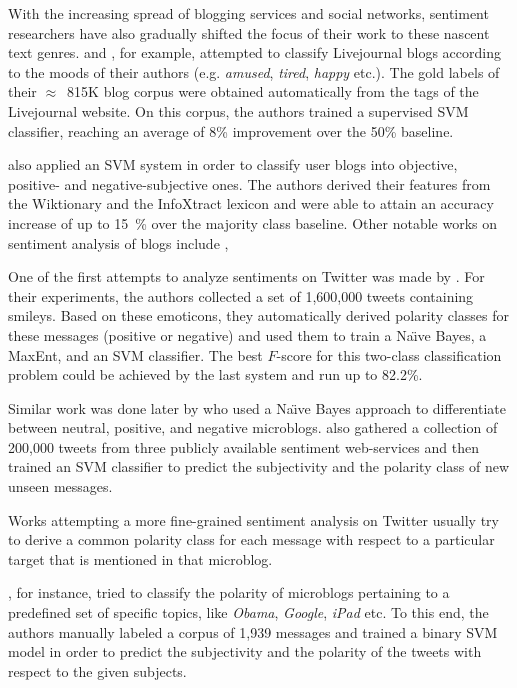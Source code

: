 With the increasing spread of blogging services and social networks,
sentiment researchers have also gradually shifted the focus of their
work to these nascent text genres. \citet{Mishne:05} and
\citet{Mishne:07}, for example, attempted to classify Livejournal
blogs according to the moods of their authors (e.g.  \emph{amused},
\emph{tired}, \emph{happy} etc.).  The gold labels of their
$\approx$~815K blog corpus were obtained automatically from the tags
of the Livejournal website.  On this corpus, the authors trained a
supervised SVM classifier, reaching an average of 8\% improvement over
the 50\% baseline.

\citet{Chesley:06} also applied an SVM system in order to classify
user blogs into objective, positive- and negative-subjective ones.
The authors derived their features from the Wiktionary and the
InfoXtract lexicon \citep{Srihari:03} and were able to attain an
accuracy increase of up to 15~\% over the majority class baseline.
Other notable works on sentiment analysis of blogs include
\citet{Godbole:07}, \citet{Gill:07}


One of the first attempts to analyze sentiments on Twitter was made by
\citet{Go:09}.  For their experiments, the authors collected a set of
1,600,000 tweets containing smileys.  Based on these emoticons, they
automatically derived polarity classes for these messages (positive or
negative) and used them to train a Na\"{\i}ve Bayes, a MaxEnt, and an
SVM classifier.  The best $F$-score for this two-class classification
problem could be achieved by the last system and run up to 82.2\%.

Similar work was done later by \citet{Pak:10} who used a Na\"{\i}ve
Bayes approach to differentiate between neutral, positive, and
negative microblogs. \citet{Barbosa:10} also gathered a collection of
200,000 tweets from three publicly available sentiment web-services
and then trained an SVM classifier to predict the subjectivity and the
polarity class of new unseen messages.

Works attempting a more fine-grained sentiment analysis on Twitter
usually try to derive a common polarity class for each message with
respect to a particular target that is mentioned in that microblog.

\citet{Jiang:11}, for instance, tried to classify the polarity of
microblogs pertaining to a predefined set of specific topics, like
\emph{Obama}, \emph{Google}, \emph{iPad} etc.  To this end, the
authors manually labeled a corpus of 1,939 messages and trained a
binary SVM model in order to predict the subjectivity and the polarity
of the tweets with respect to the given subjects.

